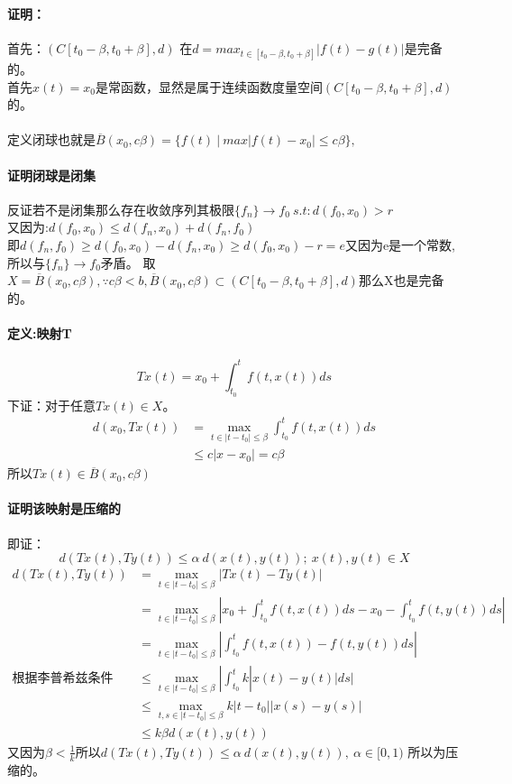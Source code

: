 \documentclass[11pt]{article}
\begin{document}
\begin{CJK*}{UTF8}{gbsn}
\paragraph{证明：}
首先：$(C[t_0-\beta,t_0+\beta],d)$
在$d=max_{t\in [t_0-\beta,t_0+\beta]}|f(t)-g(t)|$是完备的。\\
首先$x(t)=x_0$是常函数，显然是属于连续函数度量空间$(C[t_0-\beta,t_0+\beta],d)$的。\\
\\
定义闭球也就是$\overline{B}(x_0,c\beta)=\{f(t)~|~max|f(t)-x_0|\leq c\beta\},$\\
\paragraph{证明闭球是闭集} 反证若不是闭集那么存在收敛序列其极限$\{f_n\}\rightarrow f_0~$$s.t:d(f_0,x_0)>r$\\
又因为:$d(f_0,x_0)\leq d(f_n,x_0)+d(f_n,f_0)$\\
即$d(f_n,f_0)\geq d(f_0,x_0)- d(f_n,x_0)\geq d(f_0,x_0)-r=e$又因为e是一个常数,所以与$\{f_n\}\rightarrow f_0$矛盾。
 取$X=\overline{B}(x_0,c\beta),\because c\beta <b,\overline{B}(x_0,c\beta)\subset (C[t_0-\beta,t_0+\beta],d)$那么X也是完备的。\\
\paragraph{定义:映射T}\begin{equation*}
	Tx(t)=x_0+\int_{t_0}^{t}f(t,x(t))ds
\end{equation*}
下证：对于任意$Tx(t)\in X$。\\
\begin{align*}
	d(x_0,Tx(t))&=\mathop{max}_{t\in |t-t_0|\leq \beta}\int_{t_0}^{t}f(t,x(t))ds\\
		&\leq c|x-x_0|=c\beta
\end{align*}
所以$Tx(t) \in \overline{B}(x_0,c\beta) $
\paragraph{证明该映射是压缩的}即证：
\begin{equation}
	d(Tx(t),Ty(t))\leq \alpha ~d(x(t),y(t));~x(t),y(t)\in  X
\end{equation}
\begin{align*}
	d(Tx(t),Ty(t))&=\mathop{max}_{t\in |t-t_0|\leq \beta}|Tx(t)-Ty(t)|\\
	&=\mathop{max}_{t\in |t-t_0|\leq \beta}|x_0+\int_{t_0}^{t}f(t,x(t))ds-x_0-\int_{t_0}^{t}f(t,y(t))ds|\\
	&=\mathop{max}_{t\in |t-t_0|\leq \beta}|\int_{t_0}^{t}f(t,x(t))-f(t,y(t))ds|\\
	\mbox{根据李普希兹条件}&\leq \mathop{max}_{t\in |t-t_0|\leq \beta}|\int_{t_0}^{t}k|x(t)-y(t)|ds|\\
	&\leq \mathop{max}_{t,s\in |t-t_0|\leq \beta}k|t-t_0||x(s)-y(s)|\\
	&\leq k\beta d(x(t),y(t))
\end{align*}
又因为$\beta<\frac{1}{k}$所以$d(Tx(t),Ty(t))\leq \alpha ~d(x(t),y(t)),~\alpha\in [0,1)$
所以为压缩的。

\end{CJK*}
\end{document}
